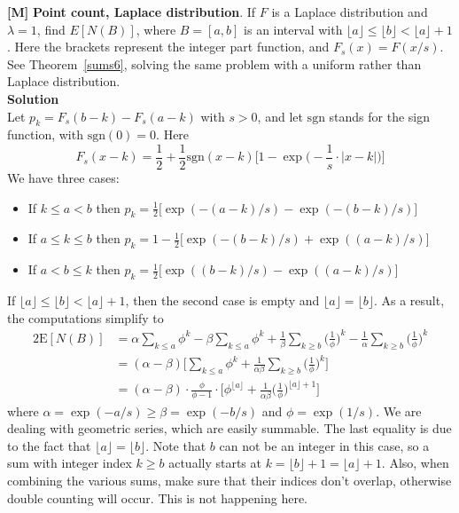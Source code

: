 \documentclass[10pt]{article}
\begin{document}
\begin{Exercise}\label{exercise1}
{\bf [M]} {\bf Point count, Laplace distribution}. If $F$ is a \textcolor{index}{Laplace distribution}  and $\lambda=1$, find $E[N(B)]$, where $B=[a,b]$ is an interval with $\lfloor a \rfloor \leq \lfloor b \rfloor < \lfloor a \rfloor +1$. Here the brackets represent the integer part function, and $F_s(x)=F(x/s)$. See Theorem~\ref{sums6}, solving the same problem with a uniform rather than Laplace distribution. \vspace{1ex}   \\
{\bf Solution} \vspace{1ex}   \\
Let  $p_k=F_s(b-k)-F_s(a-k)$ with $s>0$, and let  $\mbox{sgn}$ stands for the sign function, with $\mbox{sgn}(0)=0$. Here 
$$F_s(x-k)=\frac{1}{2}+\frac{1}{2}\mbox{sgn}(x-k)\Big[1-\exp\Big(-\frac{1}{s}\cdot|x-k|\Big)\Big] $$
We have three cases:
\begin{itemize}
 \item If $k\leq a < b$ then $p_k=\frac{1}{2}\Big[\exp(-(a-k)/s) - \exp(-(b-k)/s)\Big] $
 \item If $a\leq k \leq b$ then $p_k=1-\frac{1}{2}\Big[\exp(-(b-k)/s) +   \exp((a-k)/s)\Big] $
 \item If $a< b\leq k$ then $p_k=\frac{1}{2}\Big[\exp((b-k)/s) -   \exp((a-k)/s)\Big] $
\end{itemize}
If $\lfloor a \rfloor \leq \lfloor b \rfloor < \lfloor a \rfloor +1$, then the second case is empty and  
$\lfloor a\rfloor = \lfloor b\rfloor$. As a result, the computations simplify to
\begin{align}
2\mbox{E}[N(B)]& =\alpha\sum_{k\leq a}\phi^k -\beta\sum_{k\leq a}\phi^k 
+ \frac{1}{\beta}\sum_{k\geq b} \Big(\frac{1}{\phi}\Big)^k- \frac{1}{\alpha}\sum_{k\geq b}\Big(\frac{1}{\phi}\Big)^k \nonumber \\
 & = (\alpha-\beta)\Big[\sum_{k\leq a}\phi^k  +  \frac{1}{\alpha\beta}   \sum_{k\geq b}\Big(\frac{1}{\phi}\Big)^k  \Big] \nonumber \\
 & =(\alpha-\beta)\cdot\frac{\phi}{\phi-1}\cdot\Big[  \phi^{\lfloor a \rfloor} +\frac{1}{\alpha\beta}\Big(\frac{1}{\phi}\Big)^{\lfloor a\rfloor+1} \Big ] \nonumber
\end{align}
where $\alpha= \exp(-a/s)\geq \beta= \exp(-b/s)$ and $\phi=\exp(1/s)$. We are dealing with geometric series, which are easily summable. The last equality is due to the fact that  $\lfloor a\rfloor = \lfloor b \rfloor$. Note that $b$ can not be an integer in this case, so a sum with integer index $k\geq b$ actually starts at $k=\lfloor b \rfloor +1 = \lfloor a \rfloor + 1$.
Also, when combining the various sums, make sure that their indices don't overlap, otherwise double counting will occur. This is not happening here.
\end{Exercise}
\end{document}

